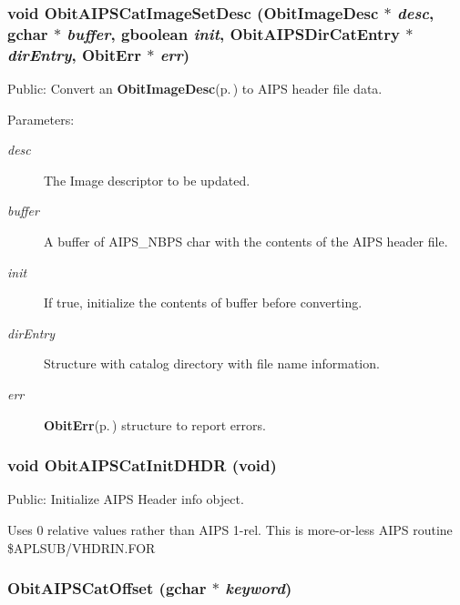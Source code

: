 \subsubsection{\setlength{\rightskip}{0pt plus 5cm}void Obit\-AIPSCat\-Image\-Set\-Desc ({\bf Obit\-Image\-Desc} $\ast$ {\em desc}, gchar $\ast$ {\em buffer}, gboolean {\em init}, {\bf Obit\-AIPSDir\-Cat\-Entry} $\ast$ {\em dir\-Entry}, {\bf Obit\-Err} $\ast$ {\em err})}\label{ObitAIPSCat_8c_a6}


Public: Convert an {\bf Obit\-Image\-Desc}{\rm (p.\,\pageref{structObitImageDesc})} to AIPS header file data. 

\begin{Desc}
\item[Parameters:]
\begin{description}
\item[{\em desc}]The Image descriptor to be updated. \item[{\em buffer}]A buffer of AIPS\_\-NBPS char with the contents of the AIPS header file. \item[{\em init}]If true, initialize the contents of buffer before converting. \item[{\em dir\-Entry}]Structure with catalog directory with file name information. \item[{\em err}]{\bf Obit\-Err}{\rm (p.\,\pageref{structObitErr})} structure to report errors. \end{description}
\end{Desc}
\subsubsection{\setlength{\rightskip}{0pt plus 5cm}void Obit\-AIPSCat\-Init\-DHDR (void)}\label{ObitAIPSCat_8c_a13}


Public: Initialize AIPS Header info object. 

Uses 0 relative values rather than AIPS 1-rel. This is more-or-less AIPS routine \$APLSUB/VHDRIN.FOR 
\subsubsection{ Obit\-AIPSCat\-Offset (gchar $\ast$ {\em keyword})}\label{ObitAIPSCat_8c_a14}


